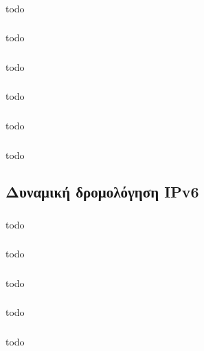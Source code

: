 \documentclass[a4paper, 12pt]{article}
\begin{document}
		\subsubsection{}
			todo

		\subsubsection{}
			todo

		\subsubsection{}
			todo

		\subsubsection{}
			todo

		\subsubsection{}
			todo

		\subsubsection{}
			todo

	\subsection{Δυναμική δρομολόγηση IPv6}

		\subsubsection{}
			todo

		\subsubsection{}
			todo

		\subsubsection{}
			todo

		\subsubsection{}
			todo

		\subsubsection{}
			todo
\end{document}
